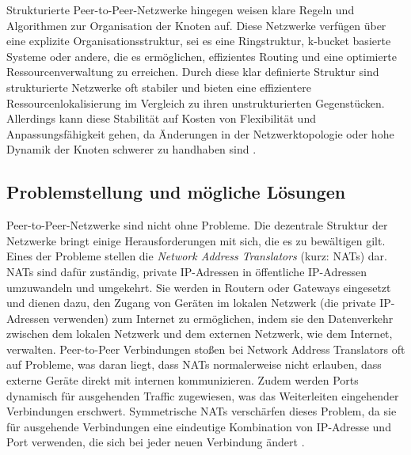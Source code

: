 Strukturierte Peer-to-Peer-Netzwerke hingegen weisen klare Regeln und Algorithmen zur Organisation der Knoten auf. Diese Netzwerke verfügen über eine explizite Organisationsstruktur, sei es eine Ringstruktur, k-bucket basierte Systeme oder andere, die es ermöglichen, effizientes Routing und eine optimierte Ressourcenverwaltung zu erreichen. Durch diese klar definierte Struktur sind strukturierte Netzwerke oft stabiler und bieten eine effizientere Ressourcenlokalisierung im Vergleich zu ihren unstrukturierten Gegenstücken. Allerdings kann diese Stabilität auf Kosten von Flexibilität und Anpassungsfähigkeit gehen, da Änderungen in der Netzwerktopologie oder hohe Dynamik der Knoten schwerer zu handhaben sind \parencite[S. 40]{Vu_P2PComputing}.


\subsection{Problemstellung und mögliche Lösungen}

Peer-to-Peer-Netzwerke sind nicht ohne Probleme. Die dezentrale Struktur der Netzwerke bringt einige Herausforderungen mit sich, die es zu bewältigen gilt. Eines der Probleme stellen die \textit{Network Address Translators} (kurz: NATs) dar. NATs sind dafür zuständig, private IP-Adressen in öffentliche IP-Adressen umzuwandeln und umgekehrt. Sie werden in Routern oder Gateways eingesetzt und dienen dazu, den Zugang von Geräten im lokalen Netzwerk (die private IP-Adressen verwenden) zum Internet zu ermöglichen, indem sie den Datenverkehr zwischen dem lokalen Netzwerk und dem externen Netzwerk, wie dem Internet, verwalten. Peer-to-Peer Verbindungen stoßen bei Network Address Translators oft auf Probleme, was daran liegt, dass NATs normalerweise nicht erlauben, dass externe Geräte direkt mit internen kommunizieren. Zudem werden Ports dynamisch für ausgehenden Traffic zugewiesen, was das Weiterleiten eingehender Verbindungen erschwert. Symmetrische NATs verschärfen dieses Problem, da sie für ausgehende Verbindungen eine eindeutige Kombination von IP-Adresse und Port verwenden, die sich bei jeder neuen Verbindung ändert \Parencite[S. 1-9]{rfc2663_NAT_Terminology}.

